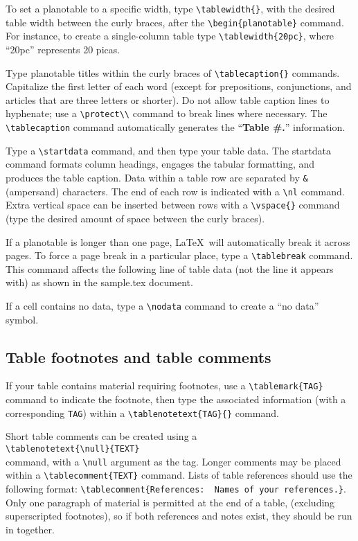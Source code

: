 \documentclass[extra,mreferee]{gji}
\begin{document}
To set a planotable to a specific width, type
\verb"\tablewidth{}", with the desired table width between
the curly braces, after the \verb"\begin{planotable}"
command.  For instance, to create a single-column table
type \verb"\tablewidth{20pc}", where ``20pc'' represents 20 picas.

Type planotable titles within the curly braces of
\verb"\tablecaption{}" commands.  Capitalize the first
letter of each word (except for prepositions, conjunctions,
and articles that are three letters or shorter).  Do not
allow table caption lines to hyphenate; use a
\verb"\protect\\" command to break lines where necessary.
The \verb"\tablecaption" command automatically generates
the ``{\bf Table \#.}'' information.

Type a \verb"\startdata" command, and then type your table
data.  The startdata command formats column headings,
engages the tabular formatting, and produces the table
caption.  Data within a table row are separated by {\tt \&}
(ampersand) characters.  The end of each row is indicated
with a \verb"\nl" command.  Extra vertical space can be
inserted between rows with a \verb"\vspace{}" command
(type the desired amount of space between the curly
braces).

If a planotable is longer than one page, \LaTeX\ will
automatically break it across pages.  To force a page
break in a particular place, type a \verb"\tablebreak"
command.  This command affects the following line of
table data (not the line it appears with) as shown
in the sample.tex document.

If a cell contains no data, type a \verb"\nodata"
command to create a ``no data'' symbol.


\subsection{Table footnotes and table comments}

If your table contains material requiring footnotes, use a
\verb"\tablemark{TAG}" command to indicate the footnote,
then type the associated information (with a corresponding
{\tt TAG}) within a \verb"\tablenotetext{TAG}{}" command.

Short table comments can be created using a\\
\verb"\tablenotetext{\null}{TEXT}"\\
command, with a
\verb"\null" argument as the tag.  Longer comments may
be placed within a \verb"\tablecomment{TEXT}" command.
Lists of table references should use the following
format: \verb"\tablecomment{References:  Names of your references.}".
Only one paragraph of material is permitted  at the end of a table,
(excluding superscripted footnotes), so if both references and notes
exist, they should be run in together.
\end{document}
